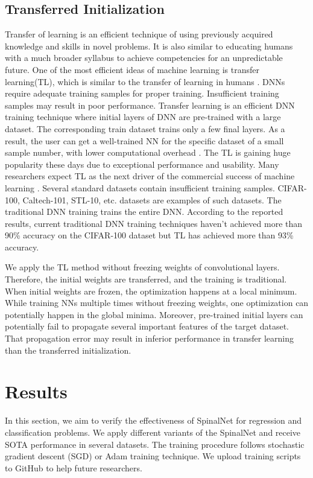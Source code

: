 \documentclass[journal]{IEEEtran}
\begin{document}
\subsection{Transferred Initialization}
 Transfer of learning is an efficient technique of using previously acquired knowledge and skills in novel problems. It is also similar to educating humans with a much broader syllabus to achieve competencies for an unpredictable future. One of the most efficient ideas of machine learning is transfer learning(TL), which is similar to the transfer of learning in humans \cite{wolf2019transfertransfo}. DNNs require adequate training samples for proper training. Insufficient training samples may result in poor performance. Transfer learning is an efficient DNN training technique where initial layers of DNN are pre-trained with a large dataset. The corresponding train dataset trains only a few final layers. As a result, the user can get a well-trained NN for the specific dataset of a small sample number, with lower computational overhead \cite{shao2018starcraft}.  The TL is gaining huge popularity these days due to exceptional performance and usability. Many researchers expect TL as the next driver of the commercial success of machine learning \cite{ng2016nuts}. Several standard datasets contain insufficient training samples. CIFAR-100, Caltech-101, STL-10, etc. datasets are examples of such datasets. The traditional DNN training trains the entire DNN. According to the reported results, current traditional DNN training techniques haven't achieved more than 90\% accuracy on the CIFAR-100 dataset but TL has achieved more than 93\% accuracy. 

We apply the TL method without freezing weights of convolutional layers. Therefore, the initial weights are transferred, and the training is traditional. When initial weights are frozen, the optimization happens at a local minimum. While training NNs multiple times without freezing weights, one optimization can potentially happen in the global minima. Moreover, pre-trained initial layers can potentially fail to propagate several important features of the target dataset. That propagation error may result in inferior performance in transfer learning than the transferred initialization.  




\section{Results}
In this section, we aim to verify the effectiveness of SpinalNet for regression and classification problems. We apply different variants of the SpinalNet and receive SOTA performance in several datasets. The training procedure follows stochastic gradient descent (SGD) or Adam training technique. We upload training scripts to GitHub to help future researchers.   
\end{document}
